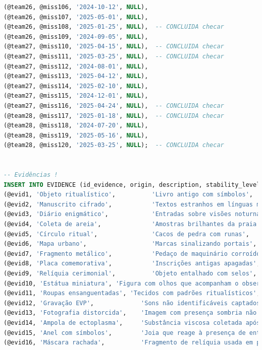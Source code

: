 \documentclass[12pt,a4paper]{report}
\begin{document}
\begin{lstlisting}[language=SQL, caption=population.sql]
(@team26, @miss106, '2024-10-12', NULL),
(@team26, @miss107, '2025-05-01', NULL),
(@team26, @miss108, '2025-01-25', NULL),  -- CONCLUIDA checar
(@team26, @miss109, '2024-09-05', NULL),
(@team27, @miss110, '2025-04-15', NULL),  -- CONCLUIDA checar
(@team27, @miss111, '2025-03-25', NULL),  -- CONCLUIDA checar
(@team27, @miss112, '2024-08-01', NULL),
(@team27, @miss113, '2025-04-12', NULL),
(@team27, @miss114, '2025-02-10', NULL),
(@team27, @miss115, '2024-12-01', NULL),
(@team27, @miss116, '2025-04-24', NULL),  -- CONCLUIDA checar
(@team28, @miss117, '2025-01-18', NULL),  -- CONCLUIDA checar
(@team28, @miss118, '2024-07-20', NULL),
(@team28, @miss119, '2025-05-16', NULL),
(@team28, @miss120, '2025-03-25', NULL);  -- CONCLUIDA checar


-- Evidências !
INSERT INTO EVIDENCE (id_evidence, origin, description, stability_level, id_mission) VALUES
(@evid1, 'Objeto ritualístico',          'Livro antigo com símbolos',                'Perigoso',  @miss1),
(@evid2, 'Manuscrito cifrado',           'Textos estranhos em línguas mortas',       'Volatil',   @miss2),
(@evid3, 'Diário enigmático',            'Entradas sobre visões noturnas',           'Volatil',  @miss4),
(@evid4, 'Coleta de areia',              'Amostras brilhantes da praia',             'Estável',   @miss4),
(@evid5, 'Círculo ritual',               'Cacos de pedra com runas',                 'Perigoso',  @miss5),
(@evid6, 'Mapa urbano',                  'Marcas sinalizando portais',               'Volatil',   @miss6),
(@evid7, 'Fragmento metálico',           'Pedaço de maquinário corroído',            'Estável',   @miss7),
(@evid8, 'Placa comemorativa',           'Inscrições antigas apagadas',              'Volatil',  @miss8),
(@evid9, 'Relíquia cerimonial',          'Objeto entalhado com selos',               'Perigoso',  @miss9),
(@evid10, 'Estátua miniatura', 'Figura com olhos que acompanham o observador', 'Volátil', @miss2),
(@evid11, 'Roupas ensanguentadas', 'Tecidos com padrões ritualísticos', 'Perigoso', @miss3),
(@evid12, 'Gravação EVP',             'Sons não identificáveis captados em ritual',        'Estável',   @miss4),
(@evid13, 'Fotografia distorcida',    'Imagem com presença sombria não observada a olho nu','Volatil', @miss5),
(@evid14, 'Ampola de ectoplasma',     'Substância viscosa coletada após manifestação',     'Volatil',   @miss6),
(@evid15, 'Anel com símbolos',        'Joia que reage à presença de entidades',            'Estável',   @miss7),
(@evid16, 'Máscara rachada',          'Fragmento de relíquia usada em possessões',         'Perigoso',  @miss8),

\end{lstlisting}
\end{document}

